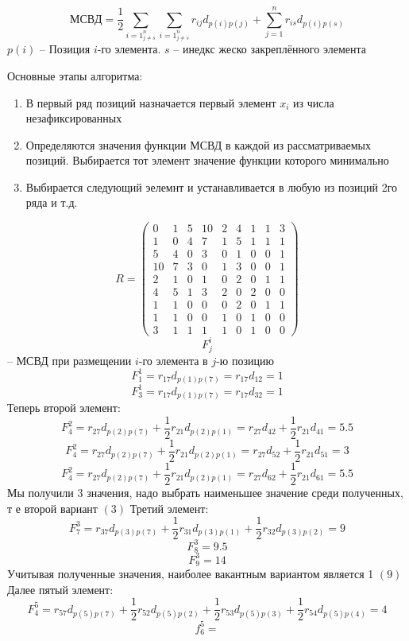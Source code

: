 \documentclass{article}
\begin{document}
	$$
	МСВД = \frac{1}{2} \sum\limits_{i = 1}_{j \ne s}^{n}\sum\limits_{i = 1}_{j \ne s}^{n} r_{ij} d_{p(i) p (j)} + \sum\limits_{j=1}^{n} r_{is} d_{p(i) p(s)}
	$$
	$p(i)$ -- Позиция $i$-го элемента. $s$ -- инедкс жеско закреплённого элемента

	Основные этапы алгоритма:
	\begin{enumerate}
		\item В первый ряд позиций назначается первый элемент $x_i$ из числа незафиксированных
		\item Определяются значения функции МСВД в каждой из рассматриваемых позиций. Выбирается тот элемент значение функции которого минимально
		\item Выбирается следующий эелемнт и устанавливается в любую из позиций 2го ряда
		и т.д.
	\end{enumerate}

	$$
	R =
	\begin{pmatrix}
		0 & 1 & 5 & 10 & 2 & 4 & 1 & 1 & 3\\
		1 & 0 & 4 & 7 & 1 & 5 & 1 & 1 & 1 \\
		5 & 4 & 0 & 3 & 0 & 1 & 0 & 0 & 1\\
		10 & 7 & 3 & 0 & 1 & 3 & 0 & 0 & 1\\
		2 & 1 & 0 & 1 & 0 & 2 & 0 & 1 & 1\\
		4 & 5 & 1 & 3 & 2 & 0 & 2 & 0 & 0\\
		1 & 1 & 0 & 0 & 0 & 2 & 0 & 1 & 1\\
		1 & 1 & 0 & 0 & 1 & 0 & 1 & 0 & 0\\
		3 & 1 & 1 & 1 & 1 & 0 & 1 & 0 & 0
	\end{pmatrix}
	$$
	$$
	F_j^i
	$$ -- МСВД при размещении $i$-го элемента в $j$-ю позицию
	$$
	F_1^1 = r_{17}d_{p(1) p(7)} = r_{17} d_{12} = 1
	$$
	$$
	F_3^1 = r_{17}d_{p(1) p(7)} = r_{17}d_{32} = 1
	$$
	Теперь второй элемент:
	$$
	F_4^2 = r_{27}d_{p(2) p(7)} + \frac{1}{2}  r_{21} d_{p(2) p(1)} = r_{27}d_{42} + \frac{1}{2} r_{21} d_{41} = 5.5
	$$
	$$
	F_4^2 = r_{27}d_{p(2) p(7)} + \frac{1}{2}  r_{21} d_{p(2) p(1)} = r_{27} d_{52} + \frac{1}{2} r_{21} d_{51} = 3
	$$
	$$
	F_4^2 = r_{27}d_{p(2) p(7)} + \frac{1}{2}  r_{21} d_{p(2) p(1)} = r_{27} d_{62} + \frac{1}{2} r_{21} d_{61} = 5.5
	$$
	Мы получили 3 значения, надо выбрать наименьшее значение среди полученных, т е второй вариант $(3)$
	Третий элемент:
	$$
	F_7^3 = r_{37} d_{p(3) p(7)} + \frac{1}{2} r_{31}d_{p(3) p(1)} + \frac{1}{2}  r_{32} d_{p(3) p(2)} = 9
	$$
	$$
	F_8^3 = 9.5
	$$
	$$
	F_9^3 = 14
	$$
	Учитывая полученные значения, наиболее вакантным вариантом является 1 $(9)$
	Далее пятый элемент:
	$$
	F_4^5 = r_{57} d_{p(5)p(7)} + \frac{1}{2} r_{52} d_{p(5) p (2)} + \frac{1}{2} r_{53} d_{p(5) p(3)} + \frac{1}{2} r_{54} d_{p(5) p(4)} = 4
	$$
	$$
	f_6^5 = 
	$$
\end{document}
